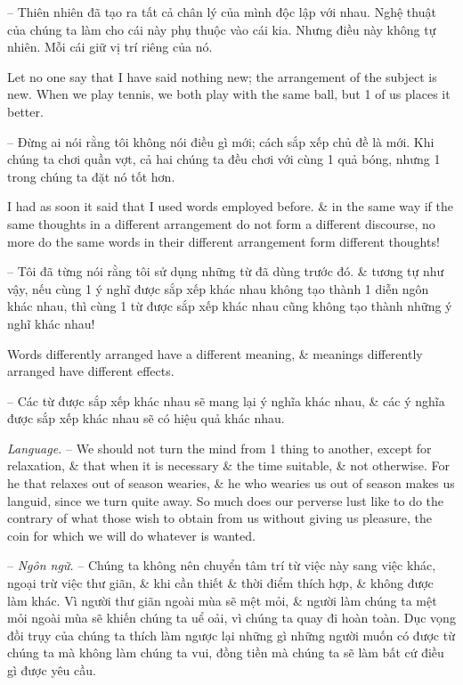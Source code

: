 \documentclass{article}
\begin{document}
\begin{enumerate}
\begin{itemize}
		-- Thiên nhiên đã tạo ra tất cả chân lý của mình độc lập với nhau. Nghệ thuật của chúng ta làm cho cái này phụ thuộc vào cái kia. Nhưng điều này không tự nhiên. Mỗi cái giữ vị trí riêng của nó.
		
		 Let no one say that I have said nothing new; the arrangement of the subject is new. When we play tennis, we both play with the same ball, but 1 of us places it better.
		
		-- Đừng ai nói rằng tôi không nói điều gì mới; cách sắp xếp chủ đề là mới. Khi chúng ta chơi quần vợt, cả hai chúng ta đều chơi với cùng 1 quả bóng, nhưng 1 trong chúng ta đặt nó tốt hơn.
		
		I had as soon it said that I used words employed before. \& in the same way if the same thoughts in a different arrangement do not form a different discourse, no more do the same words in their different arrangement form different thoughts!
		
		-- Tôi đã từng nói rằng tôi sử dụng những từ đã dùng trước đó. \& tương tự như vậy, nếu cùng 1 ý nghĩ được sắp xếp khác nhau không tạo thành 1 diễn ngôn khác nhau, thì cùng 1 từ được sắp xếp khác nhau cũng không tạo thành những ý nghĩ khác nhau!		
		
		 Words differently arranged have a different meaning, \& meanings differently arranged have different effects.
		
		-- Các từ được sắp xếp khác nhau sẽ mang lại ý nghĩa khác nhau, \& các ý nghĩa được sắp xếp khác nhau sẽ có hiệu quả khác nhau.
		
		 {\it Language.} -- We should not turn the mind from 1 thing to another, except for relaxation, \& that when it is necessary \& the time suitable, \& not otherwise. For he that relaxes out of season wearies, \& he who wearies us out of season makes us languid, since we turn quite away. So much does our perverse lust like to do the contrary of what those wish to obtain from us without giving us pleasure, the coin for which we will do whatever is wanted.
		
		-- {\it Ngôn ngữ.} -- Chúng ta không nên chuyển tâm trí từ việc này sang việc khác, ngoại trừ việc thư giãn, \& khi cần thiết \& thời điểm thích hợp, \& không được làm khác. Vì người thư giãn ngoài mùa sẽ mệt mỏi, \& người làm chúng ta mệt mỏi ngoài mùa sẽ khiến chúng ta uể oải, vì chúng ta quay đi hoàn toàn. Dục vọng đồi trụy của chúng ta thích làm ngược lại những gì những người muốn có được từ chúng ta mà không làm chúng ta vui, đồng tiền mà chúng ta sẽ làm bất cứ điều gì được yêu cầu.
		

\end{itemize}
\end{enumerate}
\end{document}
